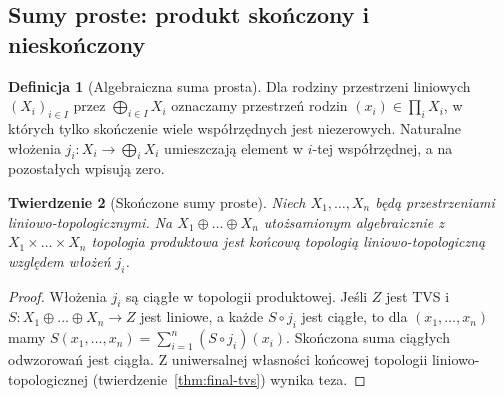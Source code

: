 \documentclass[11pt,a4paper]{article}
\numberwithin{equation}{section}
\theoremstyle{plain}
\newtheorem{twierdzenie}{Twierdzenie}[section]
\theoremstyle{definition}
\newtheorem{definicja}[twierdzenie]{Definicja}
\theoremstyle{remark}
\begin{document}
\subsection{Sumy proste: produkt skończony i nieskończony}

\begin{definicja}[Algebraiczna suma prosta]
Dla rodziny przestrzeni liniowych $(X_i)_{i\in I}$
przez $\bigoplus_{i\in I}X_i$ oznaczamy przestrzeń
rodzin $(x_i)\in\prod_iX_i$, w których tylko skończenie
wiele współrzędnych jest niezerowych. Naturalne włożenia
$j_i:X_i\to\bigoplus_iX_i$ umieszczają element w $i$-tej
współrzędnej, a na pozostałych wpisują zero.
\end{definicja}

\begin{twierdzenie}[Skończone sumy proste]
Niech $X_1,\dots,X_n$ będą przestrzeniami liniowo-topologicznymi.
Na $X_1\oplus\dots\oplus X_n$ utożsamionym algebraicznie
z $X_1\times\dots\times X_n$ topologia produktowa jest
końcową topologią liniowo-topologiczną względem włożeń $j_i$.
\end{twierdzenie}
\begin{proof}
Włożenia $j_i$ są ciągłe w topologii produktowej.
Jeśli $Z$ jest TVS i $S:X_1\oplus\dots\oplus X_n\to Z$
jest liniowe, a każde $S\circ j_i$ jest ciągłe,
to dla $(x_1,\dots,x_n)$ mamy
$S(x_1,\dots,x_n)=\sum_{i=1}^n(S\circ j_i)(x_i)$.
Skończona suma ciągłych odwzorowań jest ciągła.
Z uniwersalnej własności końcowej topologii
liniowo-topologicznej (twierdzenie~\ref{thm:final-tvs})
wynika teza.
\end{proof}
\end{document}
